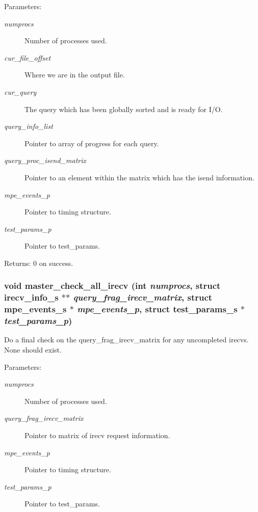 \begin{Desc}
\item[Parameters:]
\begin{description}
\item[{\em numprocs}]Number of processes used. \item[{\em cur\_\-file\_\-offset}]Where we are in the output file. \item[{\em cur\_\-query}]The query which has been globally sorted and is ready for I/O. \item[{\em query\_\-info\_\-list}]Pointer to array of progress for each query. \item[{\em query\_\-proc\_\-isend\_\-matrix}]Pointer to an element within the matrix which has the isend information. \item[{\em mpe\_\-events\_\-p}]Pointer to timing structure. \item[{\em test\_\-params\_\-p}]Pointer to test\_\-params. \end{description}
\end{Desc}
\begin{Desc}
\item[Returns:]0 on success. \end{Desc}
\subsubsection{\setlength{\rightskip}{0pt plus 5cm}void master\_\-check\_\-all\_\-irecv (int {\em numprocs}, struct \bf{irecv\_\-info\_\-s} $\ast$$\ast$ {\em query\_\-frag\_\-irecv\_\-matrix}, struct \bf{mpe\_\-events\_\-s} $\ast$ {\em mpe\_\-events\_\-p}, struct \bf{test\_\-params\_\-s} $\ast$ {\em test\_\-params\_\-p})}\label{master__help_8c_5135b98552710545bb3cb56c1c460a42}


Do a final check on the query\_\-frag\_\-irecv\_\-matrix for any uncompleted irecvs. None should exist.

\begin{Desc}
\item[Parameters:]
\begin{description}
\item[{\em numprocs}]Number of processes used. \item[{\em query\_\-frag\_\-irecv\_\-matrix}]Pointer to matrix of irecv request information. \item[{\em mpe\_\-events\_\-p}]Pointer to timing structure. \item[{\em test\_\-params\_\-p}]Pointer to test\_\-params. \end{description}
\end{Desc}

